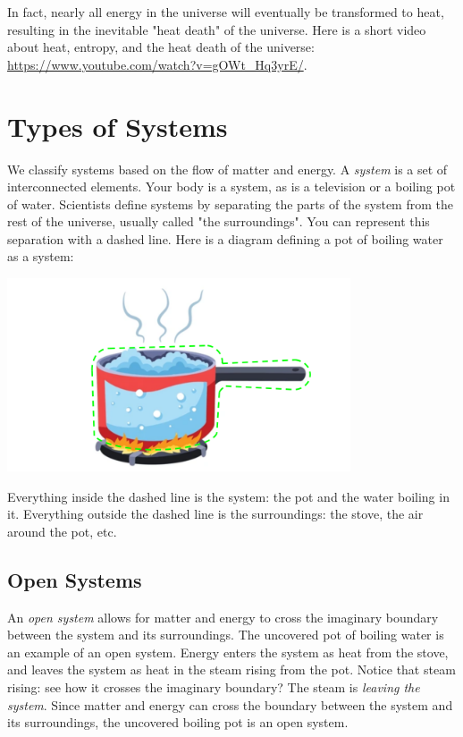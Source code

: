 In fact, nearly all energy in the universe will eventually be transformed to heat,
resulting in the inevitable "heat death" of the universe. Here is a short video 
about heat, entropy, and the heat death of the universe: 
\url{https://www.youtube.com/watch?v=gOWt_Hq3yrE/}. 

\section{Types of Systems}
We classify systems based on the flow of matter and energy. A \textit{system} is 
a set of interconnected elements. Your body is a system, as is a television or a 
boiling pot of water. Scientists define systems by separating the parts of the 
system from the rest of the universe, usually called "the surroundings". You can 
represent this separation with a dashed line. Here is a diagram defining a pot of
boiling water as a system:

\begin{center}
\includegraphics[width=4in]{pot_open_system.png}
\end{center}

Everything inside the dashed line is the system: the pot and the water boiling in
it. Everything outside the dashed line is the surroundings: the stove, the air 
around the pot, etc. 

\subsection{Open Systems}
An \textit{open system} allows for matter and energy to cross the imaginary 
boundary between the system and its surroundings. The uncovered pot of boiling 
water is an example of an open system. Energy enters the system as heat from the
stove, and leaves the system as heat in the steam rising from the pot. Notice 
that steam rising: see how it crosses the imaginary boundary? The steam is 
\textit{leaving the system}. Since matter and energy can cross the boundary 
between the system and its surroundings, the uncovered boiling pot is an open 
system. 

